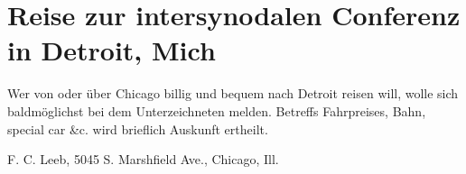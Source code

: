 \chapter[Reise zur intersynodalen Conferenz]{Reise zur intersynodalen Conferenz in Detroit, Mich}

Wer von oder über Chicago billig und bequem nach Detroit reisen will, wolle sich baldmöglichst bei dem Unterzeichneten melden. Betreffs Fahrpreises, Bahn, special car \&c. wird brieflich Auskunft ertheilt.

F. C. Leeb,
5045 S. Marshfield Ave., Chicago, Ill.
